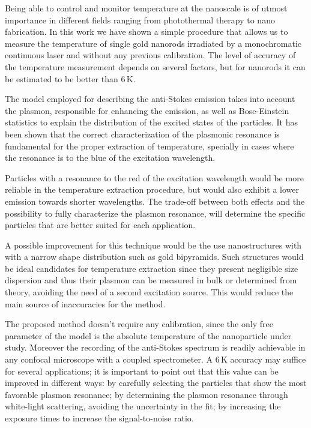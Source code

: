 \documentclass[journal=nalefd,manuscript=letter]{achemso}
\newcommand{\K}{\ensuremath{\,\textrm{K}}}
\begin{document}

Being able to control and monitor temperature at the nanoscale is of utmost
importance in different fields ranging from photothermal therapy\cite{Huang2006}
to nano fabrication\cite{Fedoruk2013}. In this work we have shown a simple
procedure that allows us to measure the temperature of single gold nanorods
irradiated by a monochromatic continuous laser and without any previous
calibration. The level of accuracy of the temperature measurement depends on
several factors, but for nanorods it can be estimated to be better than $6\K$.

The model employed for describing the anti-Stokes emission takes into account
the plasmon, responsible for enhancing the emission, as well as Bose-Einstein
statistics to explain the distribution of the excited states of the particles.
It has been shown that the correct characterization of the plasmonic resonance is
fundamental for the proper extraction of temperature, specially in cases
where the resonance is to the blue of the excitation wavelength.

Particles with a resonance to the red of the excitation wavelength would be more
reliable in the temperature extraction procedure, but would also exhibit a lower
emission towards shorter wavelengths. The trade-off between both effects and
the possibility to fully characterize the plasmon resonance, will determine the
specific particles that are better suited for each application.

A possible improvement for this technique would be the use nanostructures with 
with a narrow shape distribution such as gold
bipyramids\cite{Pelton2009}. Such structures would be ideal candidates for 
temperature extraction since they present negligible size dispersion and thus 
their plasmon can be measured in bulk or determined from theory, avoiding the need
of a second excitation source. This would reduce the main source of inaccuracies for the
method. 

The proposed method doesn't require any calibration, since the only free
parameter of the model is the absolute temperature of the nanoparticle under
study. Moreover the recording of the anti-Stokes spectrum is readily achievable
in any confocal microscope with a coupled spectrometer. A $6\K$ accuracy may
suffice for several applications; it is important to point out that this value
can be improved in different ways: by carefully selecting the particles that
show the most favorable plasmon resonance; by determining the plasmon resonance
through white-light scattering, avoiding the uncertainty in the fit; by
increasing the exposure times to increase the signal-to-noise ratio.
\end{document}
